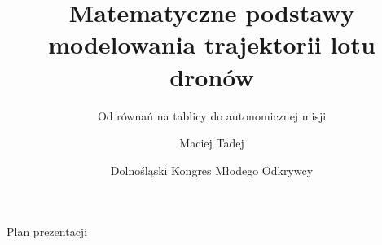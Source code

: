 \documentclass[10pt, aspectratio=169]{beamer}
\title[Matematyka i Drony]{Matematyczne podstawy modelowania trajektorii lotu dronów}
\subtitle{Od równań na tablicy do autonomicznej misji}
\author{Maciej Tadej}
\institute{Wydział Matematyki i Informatyki \\ Uniwersytet Wrocławski}
\date{Dolnośląski Kongres Młodego Odkrywcy}
\begin{document}
\begin{frame}
    \titlepage
\end{frame}

\begin{frame}{Plan prezentacji}
    \tableofcontents
\end{frame}







\end{document}
